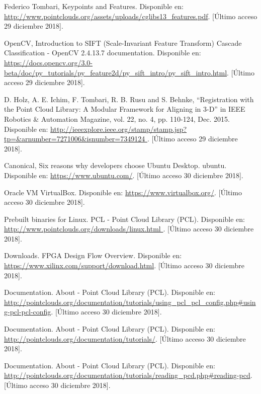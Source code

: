 \begin{thebibliography}{99}
 Federico Tombari, Keypoints and Features. Disponible en: \url{http://www.pointclouds.org/assets/uploads/cglibs13_features.pdf}. [Último acceso 29 diciembre 2018].



 OpenCV,  Introduction to SIFT (Scale-Invariant Feature Transform) Cascade Classification - OpenCV 2.4.13.7 documentation. Disponible en: \url{https://docs.opencv.org/3.0-beta/doc/py_tutorials/py_feature2d/py_sift_intro/py_sift_intro.html}. [Último acceso 29 diciembre 2018].


 D. Holz, A. E. Ichim, F. Tombari, R. B. Rusu and S. Behnke, ``Registration with the Point Cloud Library: A Modular Framework for Aligning in 3-D'' in IEEE Robotics \& Automation Magazine, vol. 22, no. 4, pp. 110-124, Dec. 2015. Disponible en: \url{http://ieeexplore.ieee.org/stamp/stamp.jsp?tp=&arnumber=7271006&isnumber=7349124
}. [Último acceso 29 diciembre 2018].


 Canonical, Six reasons why developers choose Ubuntu Desktop. ubuntu. Disponible en: \url{https://www.ubuntu.com/}. [Último acceso 30 diciembre 2018].

 Oracle VM VirtualBox. Disponible en: \url{https://www.virtualbox.org/}. [Último acceso 30 diciembre 2018].

 Prebuilt binaries for Linux. PCL - Point Cloud Library (PCL). Disponible en: \url{http://www.pointclouds.org/downloads/linux.html }. [Último acceso 30 diciembre 2018].

 Downloads. FPGA Design Flow Overview. Disponible en: \url{https://www.xilinx.com/support/download.html}. [Último acceso 30 diciembre 2018].





 Documentation. About - Point Cloud Library (PCL). Disponible en: \url{http://pointclouds.org/documentation/tutorials/using_pcl_pcl_config.php#using-pcl-pcl-config}. [Último acceso 30 diciembre 2018].


 Documentation. About - Point Cloud Library (PCL). Disponible en: \url{http://pointclouds.org/documentation/tutorials/}. [Último acceso 30 diciembre 2018].

 Documentation. About - Point Cloud Library (PCL). Disponible en: \url{http://pointclouds.org/documentation/tutorials/reading_pcd.php#reading-pcd}. [Último acceso 30 diciembre 2018].


\end{thebibliography}
